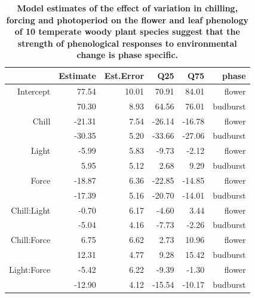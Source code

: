 \documentclass[11pt]{article}
\begin{document}
\begin{table}[!ht]
\centering
\begin{tabular}{|r|r|r|r|r|r|}
  \hline
 & Estimate & Est.Error & Q25 & Q75 & phase \\ 
  \hline
Intercept & 77.54 & 10.01 & 70.91 & 84.01 & flower \\ 
 & 70.30 & 8.93 & 64.56 & 76.01 & budburst \\ 
  \hline
  Chill & -21.31 & 7.54 & -26.14 & -16.78 & flower\\ 
   & -30.35 & 5.20 & -33.66 & -27.06 & budburst\\ 
 \hline
  Light & -5.99 & 5.83 & -9.73 & -2.12 & flower\\ 
   & 5.95 & 5.12 & 2.68 & 9.29 & budburst\\ 
  \hline
  Force & -18.87 & 6.36 & -22.85 & -14.85 & flower\\ 
 & -17.39 & 5.16 & -20.70 & -14.01 & budburst \\ 
  \hline
  Chill:Light & -0.70 & 6.17 & -4.60 & 3.44 & flower\\ 
     & -5.04 & 4.16 & -7.73 & -2.26 & budburst\\ 
  \hline
  Chill:Force & 6.75 & 6.62 & 2.73 & 10.96 & flower \\ 
   & 12.31 & 4.77 & 9.28 & 15.42 & budburst \\ 
  \hline
  Light:Force & -5.42 & 6.22 & -9.39 & -1.30 & flower \\ 
    & -12.90 & 4.12 & -15.54 & -10.17 & budburst\\ 
   \hline
\end{tabular}
\caption{\textbf{Model estimates of the effect of variation in chilling, forcing and photoperiod on the flower and leaf phenology of 10 temperate woody plant species suggest that the strength of phenological responses to environmental change is phase specific.}}
\label{tab:modelests}
\end{table}

\pagebreak


\pagebreak
\pagebreak

\end{document}
